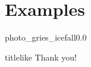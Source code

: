 \section{Examples}




    \begin{backgroundframe}{photo_gries_icefall}{0.0}{}
      \vspace{60mm}\hfill
      \begin{beamercolorbox}[sep=1em,wd=30mm]{titlelike}
        Thank you!
      \end{beamercolorbox}
    \end{backgroundframe}


